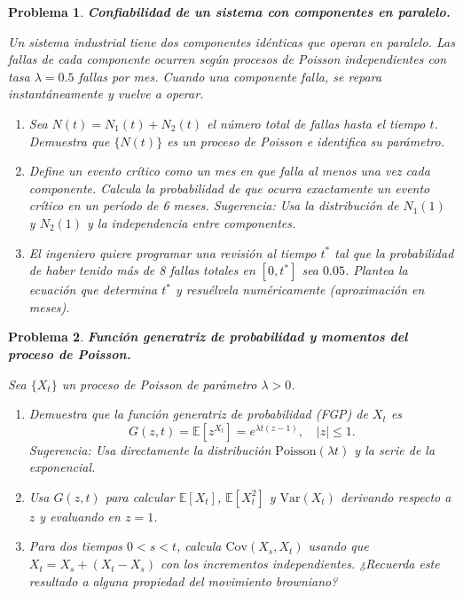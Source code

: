 \documentclass[12pt]{article}
\newtheorem{problem}{Problema}
\begin{document}
\begin{problem}
\textbf{Confiabilidad de un sistema con componentes en paralelo.}

Un sistema industrial tiene dos componentes idénticas que operan en paralelo. Las fallas de cada componente ocurren según procesos de Poisson independientes con tasa $\lambda = 0.5$ fallas por mes. Cuando una componente falla, se repara instantáneamente y vuelve a operar.

\begin{enumerate}
    \item[(a)] Sea $N(t) = N_1(t) + N_2(t)$ el número total de fallas hasta el tiempo $t$. Demuestra que $\{N(t)\}$ es un proceso de Poisson e identifica su parámetro.

    \item[(b)] Define un \emph{evento crítico} como un mes en que falla al menos una vez cada componente. Calcula la probabilidad de que ocurra exactamente un evento crítico en un período de 6 meses. \textit{Sugerencia:} Usa la distribución de $N_1(1)$ y $N_2(1)$ y la independencia entre componentes.

    \item[(c)] El ingeniero quiere programar una revisión al tiempo $t^*$ tal que la probabilidad de haber tenido más de 8 fallas totales en $[0, t^*]$ sea $0.05$. Plantea la ecuación que determina $t^*$ y resuélvela numéricamente (aproximación en meses).
\end{enumerate}
\end{problem}

\begin{problem}
\textbf{Función generatriz de probabilidad y momentos del proceso de Poisson.}

Sea $\{X_t\}$ un proceso de Poisson de parámetro $\lambda > 0$.

\begin{enumerate}
    \item[(a)] Demuestra que la función generatriz de probabilidad (FGP) de $X_t$ es
    \[
        G(z, t) = \mathbb{E}[z^{X_t}] = e^{\lambda t(z - 1)}, \quad |z| \le 1.
    \]
    \textit{Sugerencia:} Usa directamente la distribución $\mathrm{Poisson}(\lambda t)$ y la serie de la exponencial.

    \item[(b)] Usa $G(z,t)$ para calcular $\mathbb{E}[X_t]$, $\mathbb{E}[X_t^2]$ y $\mathrm{Var}(X_t)$ derivando respecto a $z$ y evaluando en $z = 1$.

    \item[(c)] Para dos tiempos $0 < s < t$, calcula $\mathrm{Cov}(X_s, X_t)$ usando que $X_t = X_s + (X_t - X_s)$ con los incrementos independientes. ¿Recuerda este resultado a alguna propiedad del movimiento browniano?
\end{enumerate}
\end{problem}
\end{document}

